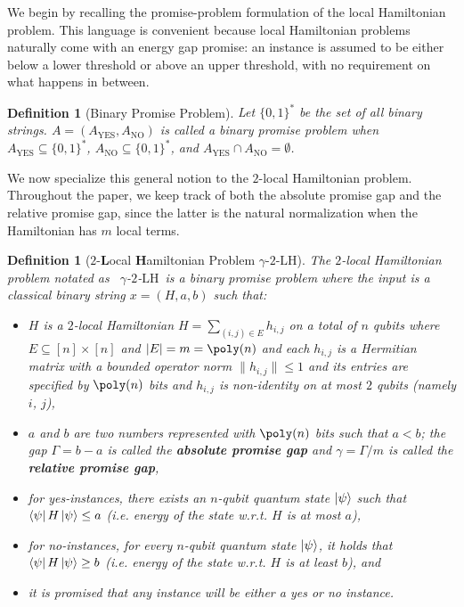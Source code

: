 \documentclass[11pt]{article}
\theoremstyle{plain}
\newtheorem{definition}[theorem]{Definition}
\newcommand{\kLH}{$\gamma$-$2$-$\mathrm{LH}$}
\begin{document}
We begin by recalling the promise-problem formulation of the local Hamiltonian problem.  This language is convenient because local Hamiltonian problems naturally come with an energy gap promise: an instance is assumed to be either below a lower threshold or above an upper threshold, with no requirement on what happens in between.

\begin{definition}[Binary Promise Problem]
Let $\{0, 1\}^*$ be the set of all binary strings. $A = \left(A_{\mathrm{YES}}, A_{\mathrm{NO}}\right)$ is called a binary promise problem when $A_{\mathrm{YES}} \subseteq \{0, 1\}^*$, $A_{\mathrm{NO}} \subseteq \{0, 1\}^*$, and $A_{\mathrm{YES}} \cap A_{\mathrm{NO}} = \emptyset$.
\end{definition}

We now specialize this general notion to the $2$-local Hamiltonian problem.  Throughout the paper, we keep track of both the absolute promise gap and the relative promise gap, since the latter is the natural normalization when the Hamiltonian has $m$ local terms.

\begin{definition}[$2$-\textbf{L}ocal \textbf{H}amiltonian Problem \kLH]
\label{defn:k-LH}
The $2$-local Hamiltonian problem notated as \ \kLH\ is a binary promise problem where the input is a classical binary string $x = (H, a, b)$ such that:
\begin{itemize}
    \item $H$ is a $2$-local Hamiltonian $H = \sum\limits_{(i, j) \in E} h_{i, j}$ on a total of $n$ qubits where $E \subseteq [n] \times [n]$ and $|E| = m = \poly(n)$ and each $h_{i,j}$ is a Hermitian matrix with a bounded operator norm $\|h_{i,j}\| \leq 1$ and its entries are specified by $\poly(n)$ bits and $h_{i,j}$ is non-identity on at most $2$ qubits (namely $i$, $j$),
    \item $a$ and $b$ are two numbers represented with $\poly(n)$ bits such that $a < b$; the gap $\Gamma = b - a$ is called the \textbf{absolute promise gap} and $\gamma = \Gamma / m$ is called the \textbf{relative promise gap},
    \item for yes-instances, there exists an $n$-qubit quantum state $\ket{\psi}$ such that $\bra{\psi}H\ket{\psi} \leq a$ (i.e. energy of the state w.r.t. $H$ is at most $a$),
    \item for no-instances, for every $n$-qubit quantum state $\ket{\psi}$, it holds that $\bra{\psi}H\ket{\psi} \geq b$ (i.e. energy of the state w.r.t. $H$ is at least $b$), and
    \item it is promised that any instance will be either a yes or no instance.
\end{itemize}
\end{definition}
\end{document}
